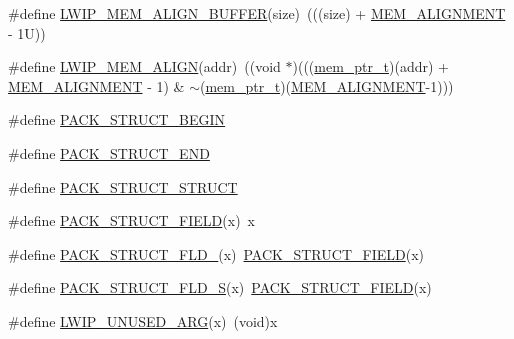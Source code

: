 \begin{DoxyCompactItemize}
\item 
\#define \hyperlink{group__compiler__abstraction_ga25591dcb72fccc7b5dc46fbc1959694e}{L\+W\+I\+P\+\_\+\+M\+E\+M\+\_\+\+A\+L\+I\+G\+N\+\_\+\+B\+U\+F\+F\+ER}(size)~(((size) + \hyperlink{group__lwip__opts__mem_ga97343214666ee6dcb18c0bd77b441ea7}{M\+E\+M\+\_\+\+A\+L\+I\+G\+N\+M\+E\+NT} -\/ 1\+U))
\item 
\#define \hyperlink{group__compiler__abstraction_gaa8e8724eb1c220cbbb90de9e175ce1dc}{L\+W\+I\+P\+\_\+\+M\+E\+M\+\_\+\+A\+L\+I\+GN}(addr)~((void $\ast$)(((\hyperlink{group__compiler__abstraction_gaf019cbb71af10dcfda7758b21e655307}{mem\+\_\+ptr\+\_\+t})(addr) + \hyperlink{group__lwip__opts__mem_ga97343214666ee6dcb18c0bd77b441ea7}{M\+E\+M\+\_\+\+A\+L\+I\+G\+N\+M\+E\+NT} -\/ 1) \& $\sim$(\hyperlink{group__compiler__abstraction_gaf019cbb71af10dcfda7758b21e655307}{mem\+\_\+ptr\+\_\+t})(\hyperlink{group__lwip__opts__mem_ga97343214666ee6dcb18c0bd77b441ea7}{M\+E\+M\+\_\+\+A\+L\+I\+G\+N\+M\+E\+NT}-\/1)))
\item 
\#define \hyperlink{group__compiler__abstraction_ga73199061891adf1b912d20835c7d5e96}{P\+A\+C\+K\+\_\+\+S\+T\+R\+U\+C\+T\+\_\+\+B\+E\+G\+IN}
\item 
\#define \hyperlink{group__compiler__abstraction_ga465fef70f294e21cbf4ea51fc342f20e}{P\+A\+C\+K\+\_\+\+S\+T\+R\+U\+C\+T\+\_\+\+E\+ND}
\item 
\#define \hyperlink{group__compiler__abstraction_ga33623da05bb55497534c3dc26ebebeb2}{P\+A\+C\+K\+\_\+\+S\+T\+R\+U\+C\+T\+\_\+\+S\+T\+R\+U\+CT}
\item 
\#define \hyperlink{group__compiler__abstraction_gaab0b988124e37a978d9a88e7c1c778e0}{P\+A\+C\+K\+\_\+\+S\+T\+R\+U\+C\+T\+\_\+\+F\+I\+E\+LD}(x)~x
\item 
\#define \hyperlink{group__compiler__abstraction_gaa8f75e4117374c2d09fbda5566e40b62}{P\+A\+C\+K\+\_\+\+S\+T\+R\+U\+C\+T\+\_\+\+F\+L\+D\+\_}(x)~\hyperlink{group__compiler__abstraction_gaab0b988124e37a978d9a88e7c1c778e0}{P\+A\+C\+K\+\_\+\+S\+T\+R\+U\+C\+T\+\_\+\+F\+I\+E\+LD}(x)
\item 
\#define \hyperlink{group__compiler__abstraction_gacc89e224363eb0ebca24b64d925c3cb7}{P\+A\+C\+K\+\_\+\+S\+T\+R\+U\+C\+T\+\_\+\+F\+L\+D\+\_\+S}(x)~\hyperlink{group__compiler__abstraction_gaab0b988124e37a978d9a88e7c1c778e0}{P\+A\+C\+K\+\_\+\+S\+T\+R\+U\+C\+T\+\_\+\+F\+I\+E\+LD}(x)
\item 
\#define \hyperlink{group__compiler__abstraction_ga70624a5deb8b9199406372a7f3603ecf}{L\+W\+I\+P\+\_\+\+U\+N\+U\+S\+E\+D\+\_\+\+A\+RG}(x)~(void)x
\end{DoxyCompactItemize}
